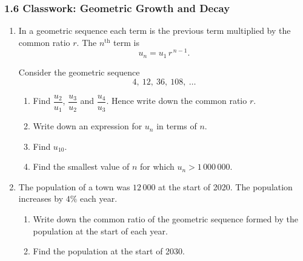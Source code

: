 \documentclass[12pt, twoside]{article}
\begin{document}
\subsubsection*{1.6 Classwork: Geometric Growth and Decay}

\begin{enumerate}[itemsep=0.15cm]

\item[1.]

In a geometric sequence each term is the previous term multiplied by
the common ratio $r$. The $n^{\text{th}}$ term is
$$u_{n} = u_{1}\,r^{\,n - 1}.$$

Consider the geometric sequence
$$4, \ 12, \ 36, \ 108, \ \ldots$$

\begin{enumerate}[itemsep=0.1cm]
  \item Find $\dfrac{u_{2}}{u_{1}}$, $\dfrac{u_{3}}{u_{2}}$ and
  $\dfrac{u_{4}}{u_{3}}$. Hence write down the common ratio $r$.
  \item Write down an expression for $u_{n}$ in terms of $n$.
  \item Find $u_{10}$.
  \item Find the smallest value of $n$ for which $u_{n} > 1\,000\,000$.
\end{enumerate}


\newpage

\item[2.]

The population of a town was $12\,000$ at the start of 2020. The
population increases by $4\%$ each year.

\begin{enumerate}[itemsep=0.1cm]
  \item Write down the common ratio of the geometric sequence formed by
  the population at the start of each year.
  \item Find the population at the start of 2030.
\end{enumerate}


\end{enumerate}
\end{document}
